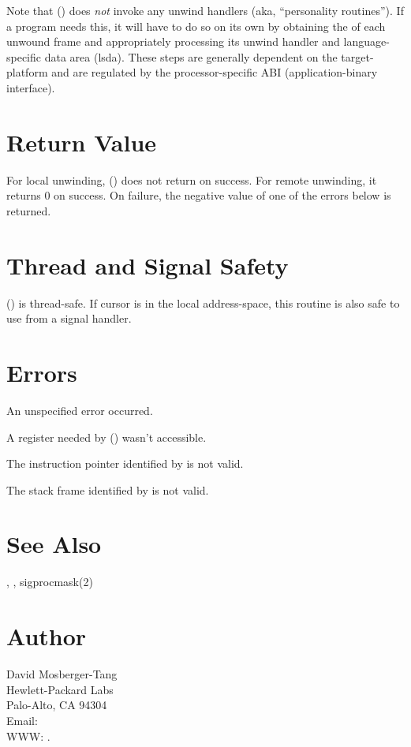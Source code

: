 \documentclass{article}
\begin{document}
Note that () does \emph{not} invoke any unwind
handlers (aka, ``personality routines'').  If a program needs this, it
will have to do so on its own by obtaining the 
of each unwound frame and appropriately processing its unwind handler
and language-specific data area (lsda).  These steps are generally
dependent on the target-platform and are regulated by the
processor-specific ABI (application-binary interface).

\section{Return Value}

For local unwinding, () does not return on success.
For remote unwinding, it returns 0 on success.  On failure, the
negative value of one of the errors below is returned.

\section{Thread and Signal Safety}

() is thread-safe.  If cursor  is in the
local address-space, this routine is also safe to use from a signal
handler.

\section{Errors}

\begin{Description}
\item[\Const{UNW\_EUNSPEC}] An unspecified error occurred.
\item[\Const{UNW\_EBADREG}] A register needed by () wasn't
  accessible.
\item[\Const{UNW\_EINVALIDIP}] The instruction pointer identified by
   is not valid.
\item[\Const{UNW\_BADFRAME}] The stack frame identified by
   is not valid.
\end{Description}

\section{See Also}

,
,
sigprocmask(2)

\section{Author}

\noindent
David Mosberger-Tang\\
Hewlett-Packard Labs\\
Palo-Alto, CA 94304\\
Email: \\
WWW: .
\LatexManEnd
\end{document}
